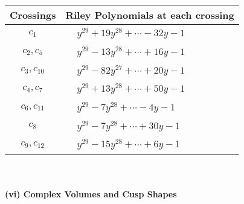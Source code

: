 \documentclass[1p]{elsarticle_modified}
\theoremstyle{definition}
\begin{document}
\begin{tabular}{m{50pt}|m{274pt}}
Crossings & \hspace{64pt}Riley Polynomials at each crossing \\
\hline $$\begin{aligned}c_{1}\end{aligned}$$&$\begin{aligned}
&y^{29}+19 y^{28}+\cdots-32 y-1
\end{aligned}$\\
\hline $$\begin{aligned}c_{2},c_{5}\end{aligned}$$&$\begin{aligned}
&y^{29}-13 y^{28}+\cdots+16 y-1
\end{aligned}$\\
\hline $$\begin{aligned}c_{3},c_{10}\end{aligned}$$&$\begin{aligned}
&y^{29}-82 y^{27}+\cdots+20 y-1
\end{aligned}$\\
\hline $$\begin{aligned}c_{4},c_{7}\end{aligned}$$&$\begin{aligned}
&y^{29}+13 y^{28}+\cdots+50 y-1
\end{aligned}$\\
\hline $$\begin{aligned}c_{6},c_{11}\end{aligned}$$&$\begin{aligned}
&y^{29}-7 y^{28}+\cdots-4 y-1
\end{aligned}$\\
\hline $$\begin{aligned}c_{8}\end{aligned}$$&$\begin{aligned}
&y^{29}-7 y^{28}+\cdots+30 y-1
\end{aligned}$\\
\hline $$\begin{aligned}c_{9},c_{12}\end{aligned}$$&$\begin{aligned}
&y^{29}-15 y^{28}+\cdots+6 y-1
\end{aligned}$\\
\hline
\end{tabular}\\~\\
\newpage\flushleft \textbf{(vi) Complex Volumes and Cusp Shapes}
\end{document}
